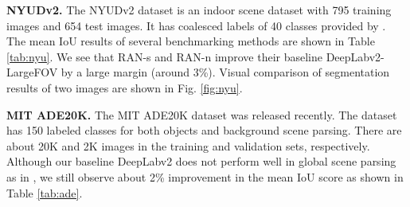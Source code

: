 \documentclass[runningheads]{llncs}
\begin{document}
{\bf NYUDv2.} The NYUDv2 dataset \cite{Silberman:ECCV12} is an indoor
scene dataset with 795 training images and 654 test images. It has
coalesced labels of 40 classes provided by \cite{gupta2013perceptual}.
The mean IoU results of several benchmarking methods are shown in Table
\ref{tab:nyu}.  We see that RAN-s and RAN-n improve their baseline
DeepLabv2-LargeFOV by a large margin (around 3\%). Visual comparison
of segmentation results of two images are shown in Fig. \ref{fig:nyu}.

\begin{table}[h]
\centering
{}
\caption{Comparison of the mean IoU scores () of several benchmarking
methods on the NYU-Depth2 dataset.}\label{tab:nyu}
\end{table}






{\bf MIT ADE20K.} The MIT ADE20K dataset \cite{zhou2016semantic} was
released recently. The dataset has 150 labeled classes for both objects
and background scene parsing. There are about 20K and 2K images in the
training and validation sets, respectively. Although our baseline DeepLabv2 does not perform well in global
scene parsing as in 
\cite{hu2016recalling, zhao2016pyramid}, we still observe about 2\% improvement in the
mean IoU score as shown in Table \ref{tab:ade}. 

\begin{table}[h]
\centering
{}
\caption{Comparison of the mean IoU scores () of several benchmarking
methods on the ADE20K dataset.}\label{tab:ade}
\end{table}
\end{document}
